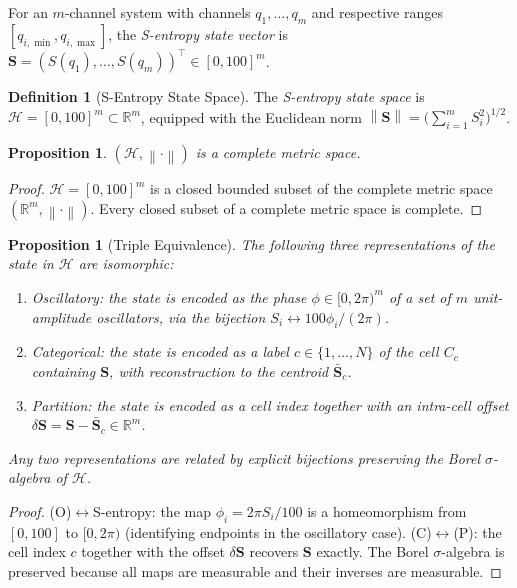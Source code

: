 \documentclass[10pt,twocolumn]{article}
\theoremstyle{plain}
\newtheorem{proposition}[theorem]{Proposition}
\theoremstyle{definition}
\newtheorem{definition}[theorem]{Definition}
\theoremstyle{remark}
\newcommand{\R}{\mathbb{R}}
\newcommand{\Hcal}{\mathcal{H}}
\newcommand{\norm}[1]{\left\|#1\right\|}
\begin{document}
For an $m$-channel system with channels $q_1,\ldots,q_m$ and respective
ranges $[q_{i,\min},q_{i,\max}]$, the \emph{S-entropy state vector} is
$\mathbf{S} = (S(q_1),\ldots,S(q_m))^\top \in [0,100]^m$.

\begin{definition}[S-Entropy State Space]
\label{def:sespace}
The \emph{S-entropy state space} is
$\Hcal = [0,100]^m \subset \R^m$,
equipped with the Euclidean norm
$\norm{\mathbf{S}} = \bigl(\sum_{i=1}^m S_i^2\bigr)^{1/2}$.
\end{definition}

\begin{proposition}
\label{prop:complete}
$(\Hcal, \norm{\cdot})$ is a complete metric space.
\end{proposition}

\begin{proof}
$\Hcal = [0,100]^m$ is a closed bounded subset of the complete metric
space $(\R^m, \norm{\cdot})$.  Every closed subset of a complete metric
space is complete.
\end{proof}

\begin{proposition}[Triple Equivalence]
\label{prop:triple}
The following three representations of the state in $\Hcal$ are
isomorphic:
\begin{enumerate}
  \item[(O)] \emph{Oscillatory}: the state is encoded as the phase
    $\phi \in [0, 2\pi)^m$ of a set of $m$ unit-amplitude oscillators,
    via the bijection $S_i \leftrightarrow 100\phi_i/(2\pi)$.
  \item[(C)] \emph{Categorical}: the state is encoded as a label
    $c \in \{1,\ldots,N\}$ of the cell $C_c$ containing $\mathbf{S}$,
    with reconstruction to the centroid $\bar{\mathbf{S}}_c$.
  \item[(P)] \emph{Partition}: the state is encoded as a cell index
    together with an intra-cell offset
    $\delta\mathbf{S} = \mathbf{S} - \bar{\mathbf{S}}_c \in \R^m$.
\end{enumerate}
Any two representations are related by explicit bijections preserving
the Borel $\sigma$-algebra of $\Hcal$.
\end{proposition}

\begin{proof}
(O)$\leftrightarrow$S-entropy: the map $\phi_i = 2\pi S_i/100$ is a
homeomorphism from $[0,100]$ to $[0,2\pi)$ (identifying endpoints in
the oscillatory case).  (C)$\leftrightarrow$(P): the cell index $c$
together with the offset $\delta\mathbf{S}$ recovers $\mathbf{S}$ exactly.
The Borel $\sigma$-algebra is preserved because all maps are measurable
and their inverses are measurable.
\end{proof}
\end{document}
